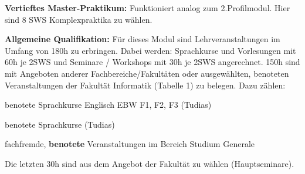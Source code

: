 \documentclass[a4paper,12pt]{report}
\begin{document}
\begin{itemize*}
	\item \textbf{Vertieftes Master-Praktikum:} Funktioniert analog zum 2.Profilmodul. Hier sind 8 SWS Komplexpraktika zu wählen.
	\item \textbf{Allgemeine Qualifikation:} Für dieses Modul sind Lehrveranstaltungen im Umfang von 180h zu erbringen. Dabei werden:  Sprachkurse und Vorlesungen mit 60h je 2SWS und Seminare / Workshops mit 30h je 2SWS angerechnet. 150h sind mit Angeboten anderer Fachbereiche/Fakultäten oder ausgewählten, benoteten Veranstaltungen der Fakultät Informatik (Tabelle 1) zu belegen. Dazu zählen:
	\begin{itemize*}
    		\item benotete Sprachkurse Englisch EBW F1, F2, F3 (Tudias)
    		\item benotete Sprachkurse (Tudias)
                     \item fachfremde, \textbf{benotete} Veranstaltungen im Bereich Studium Generale
	\end{itemize*}
	\item Die letzten 30h sind aus dem Angebot der Fakultät zu wählen (Hauptseminare). 
\end{itemize*}
\end{document}
